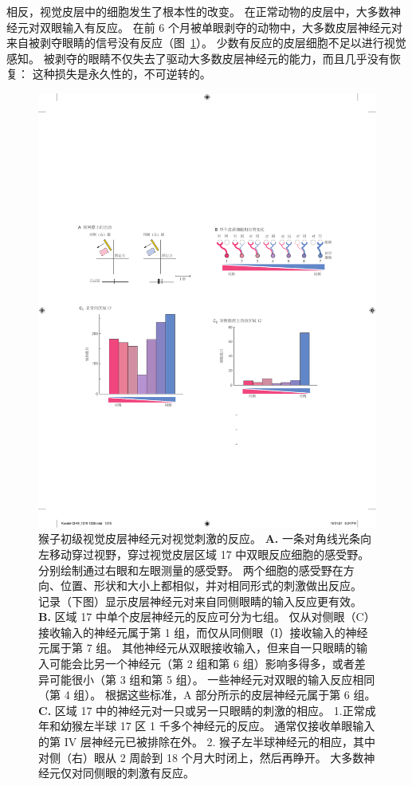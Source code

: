 相反，视觉皮层中的细胞发生了根本性的改变。
在正常动物的皮层中，大多数神经元对双眼输入有反应。
在前 6 个月被单眼剥夺的动物中，大多数皮层神经元对来自被剥夺眼睛的信号没有反应（图~\ref{fig:49_3}）。
少数有反应的皮层细胞不足以进行视觉感知。
被剥夺的眼睛不仅失去了驱动大多数皮层神经元的能力，而且几乎没有恢复：
这种损失是永久性的，不可逆转的。


\begin{figure}[htbp]
	\centering
	\includegraphics[width=1.0\linewidth]{chap49/fig_49_3}
	\caption{猴子初级视觉皮层神经元对视觉刺激的反应\cite{hubel1977ferrier}。
		\textbf{A.} 一条对角线光条向左移动穿过视野，穿过视觉皮层区域 17 中双眼反应细胞的感受野。
		分别绘制通过右眼和左眼测量的感受野。
		两个细胞的感受野在方向、位置、形状和大小上都相似，并对相同形式的刺激做出反应。
		记录（下图）显示皮层神经元对来自同侧眼睛的输入反应更有效。
		\textbf{B.} 区域 17 中单个皮层神经元的反应可分为七组。
		仅从对侧眼（C）接收输入的神经元属于第 1 组，而仅从同侧眼（I）接收输入的神经元属于第 7 组。
		其他神经元从双眼接收输入，但来自一只眼睛的输入可能会比另一个神经元（第 2 组和第 6 组）影响多得多，或者差异可能很小（第 3 组和第 5 组）。
		一些神经元对双眼的输入反应相同（第 4 组）。
		根据这些标准，A 部分所示的皮层神经元属于第 6 组。
		\textbf{C.} 区域 17 中的神经元对一只或另一只眼睛的刺激的相应。
		1.正常成年和幼猴左半球 17 区 1 千多个神经元的反应。
		通常仅接收单眼输入的第 IV 层神经元已被排除在外。
		2. 猴子左半球神经元的相应，其中对侧（右）眼从 2 周龄到 18 个月大时闭上，然后再睁开。
		大多数神经元仅对同侧眼的刺激有反应。}
	\label{fig:49_3}
\end{figure}


